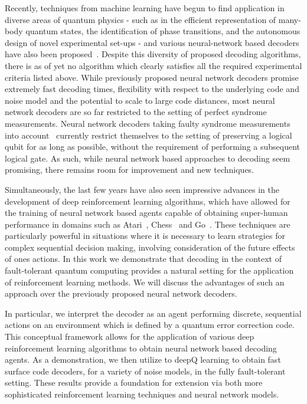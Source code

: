 \documentclass[twocolumn,preprintnumbers,amsmath,amssymb,notitlepage,nofootinbib,longbibliography,superscriptaddress,aps,pra,10pt]{revtex4-1}
\begin{document}
	Recently, techniques from machine learning have begun to find application in diverse areas of quantum physics - such as in the efficient representation of many-body quantum states, the identification of phase transitions, and the autonomous design of novel experimental set-ups - and various neural-network based decoders have also been proposed~\cite{Torlai10, Varsamopoulos17, Krastanov17, Breuckmann18, Baireuther18a, Baireuther18b, Ni18}.
	Despite this diversity of proposed decoding algorithms, there is as of yet no algorithm which clearly satisfies all the required experimental criteria listed above.
	While previously proposed neural network decoders promise extremely fast decoding times, flexibility with respect to the underlying code and noise model and the potential to scale to large code distances, most neural network decoders are so far restricted to the setting of perfect syndrome measurements.
	Neural network decoders taking faulty syndrome measurements into account~\cite{Baireuther18a,Baireuther18b} currently restrict themselves to the setting of preserving a logical qubit for as long as possible, without the requirement of performing a subsequent logical gate.
	As such, while neural network based approaches to decoding seem promising, there remains room for improvement and new techniques.

	Simultaneously, the last few years have also seen impressive advances in the development of deep reinforcement learning algorithms, which have allowed for the training of neural network based agents capable of obtaining super-human performance in domains such as Atari~\cite{Mnih15}, Chess~\cite{Silver17a} and Go~\cite{Silver17b}.
	These techniques are particularly powerful in situations where it is necessary to learn strategies for complex sequential decision making, involving consideration of the future effects of ones actions.
	In this work we demonstrate that decoding in the context of fault-tolerant quantum computing provides a natural setting for the application of reinforcement learning methods.
	We will discuss the advantages of such an approach over the previously proposed neural network decoders.

	In particular, we interpret the decoder as an agent performing discrete, sequential actions on an environment which is defined by a quantum error correction code.
	This conceptual framework allows for the application of various deep reinforcement learning algorithms to obtain neural network based decoding agents.
	As a demonstration, we then utilize to deepQ learning to obtain fast surface code decoders, for a variety of noise models, in the fully fault-tolerant setting.
	These results provide a foundation for extension via both more sophisticated reinforcement learning techniques and neural network models.
\end{document}
